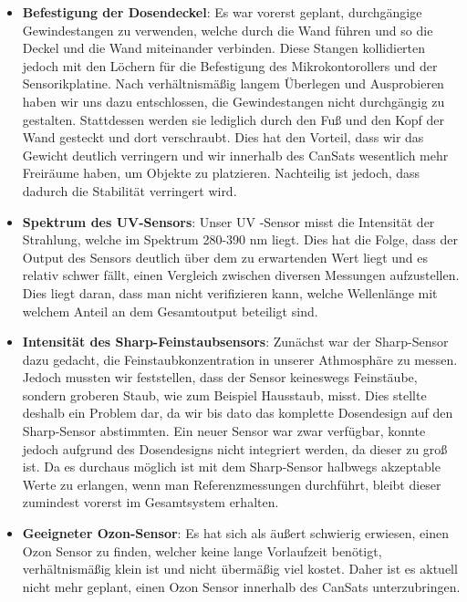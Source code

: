 \begin{itemize}
	\item \textbf{Befestigung der Dosendeckel}: Es war vorerst geplant, durchgängige Gewindestangen zu verwenden, welche durch die Wand führen und so die Deckel und die Wand miteinander verbinden. Diese Stangen kollidierten jedoch mit den Löchern für die Befestigung des Mikrokontorollers und der Sensorikplatine. Nach verhältnismäßig langem Überlegen und Ausprobieren haben wir uns dazu entschlossen, die Gewindestangen nicht durchgängig zu gestalten. Stattdessen werden sie lediglich durch den Fuß und den Kopf der Wand gesteckt und dort verschraubt. Dies hat den Vorteil, dass wir das Gewicht deutlich verringern und wir innerhalb des CanSats wesentlich mehr Freiräume haben, um Objekte zu platzieren. Nachteilig ist jedoch, dass dadurch die Stabilität verringert wird.
	\item \textbf{Spektrum des UV-Sensors}: Unser UV -Sensor misst die Intensität der Strahlung, welche im Spektrum 280-390 nm liegt. Dies hat die Folge, dass der Output des Sensors deutlich über dem zu erwartenden Wert liegt und es relativ schwer fällt, einen Vergleich zwischen diversen Messungen aufzustellen. Dies liegt daran, dass man nicht verifizieren kann, welche Wellenlänge mit welchem Anteil an dem Gesamtoutput beteiligt sind.
	\item \textbf{Intensität des Sharp-Feinstaubsensors}: Zunächst war der Sharp-Sensor dazu gedacht, die Feinstaubkonzentration in unserer Athmosphäre zu messen. Jedoch mussten wir feststellen, dass der Sensor keineswegs Feinstäube, sondern groberen Staub, wie zum Beispiel Hausstaub, misst. Dies stellte deshalb ein Problem dar, da wir bis dato das komplette Dosendesign auf den Sharp-Sensor abstimmten. Ein neuer Sensor war zwar verfügbar, konnte jedoch aufgrund des Dosendesigns nicht integriert werden, da dieser zu groß ist. Da es durchaus möglich ist mit dem Sharp-Sensor halbwegs akzeptable Werte zu erlangen, wenn man Referenzmessungen durchführt, bleibt dieser zumindest vorerst im Gesamtsystem erhalten.
	\item \textbf{Geeigneter Ozon-Sensor}: Es hat sich als äußert schwierig erwiesen, einen Ozon Sensor zu finden, welcher keine lange Vorlaufzeit benötigt, verhältnismäßig klein ist und nicht übermäßig viel kostet. Daher ist es aktuell nicht mehr geplant, einen Ozon Sensor innerhalb des CanSats unterzubringen.

\end{itemize}
